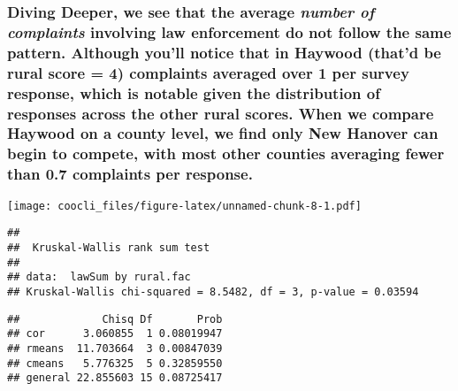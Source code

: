 \documentclass[
]{book}
\begin{document}
\hypertarget{diving-deeper-we-see-that-the-average-number-of-complaints-involving-law-enforcement-do-not-follow-the-same-pattern.-although-youll-notice-that-in-haywood-thatd-be-rural-score-4-complaints-averaged-over-1-per-survey-response-which-is-notable-given-the-distribution-of-responses-across-the-other-rural-scores.-when-we-compare-haywood-on-a-county-level-we-find-only-new-hanover-can-begin-to-compete-with-most-other-counties-averaging-fewer-than-0.7-complaints-per-response.}{%
\subsubsection{\texorpdfstring{Diving Deeper, we see that the average \emph{number of complaints} involving law enforcement do not follow the same pattern. Although you'll notice that in Haywood (that'd be rural score = 4) complaints averaged over 1 per survey response, which is notable given the distribution of responses across the other rural scores. When we compare Haywood on a county level, we find only New Hanover can begin to compete, with most other counties averaging fewer than 0.7 complaints per response.}{Diving Deeper, we see that the average number of complaints involving law enforcement do not follow the same pattern. Although you'll notice that in Haywood (that'd be rural score = 4) complaints averaged over 1 per survey response, which is notable given the distribution of responses across the other rural scores. When we compare Haywood on a county level, we find only New Hanover can begin to compete, with most other counties averaging fewer than 0.7 complaints per response.}}\label{diving-deeper-we-see-that-the-average-number-of-complaints-involving-law-enforcement-do-not-follow-the-same-pattern.-although-youll-notice-that-in-haywood-thatd-be-rural-score-4-complaints-averaged-over-1-per-survey-response-which-is-notable-given-the-distribution-of-responses-across-the-other-rural-scores.-when-we-compare-haywood-on-a-county-level-we-find-only-new-hanover-can-begin-to-compete-with-most-other-counties-averaging-fewer-than-0.7-complaints-per-response.}}

\texttt{[image: coocli\_files/figure-latex/unnamed-chunk-8-1.pdf]}

\begin{verbatim}
## 
##  Kruskal-Wallis rank sum test
## 
## data:  lawSum by rural.fac
## Kruskal-Wallis chi-squared = 8.5482, df = 3, p-value = 0.03594
\end{verbatim}

\begin{verbatim}
##             Chisq Df       Prob
## cor      3.060855  1 0.08019947
## rmeans  11.703664  3 0.00847039
## cmeans   5.776325  5 0.32859550
## general 22.855603 15 0.08725417
\end{verbatim}
\end{document}
